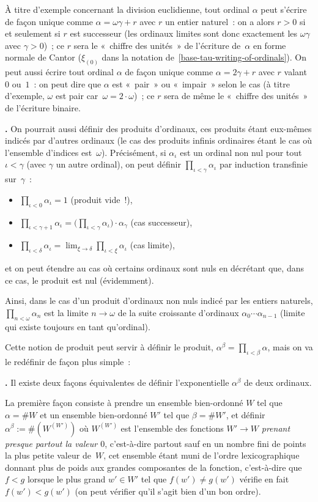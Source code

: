 \documentclass[12pt,a4paper]{article}
\theoremstyle{definition}
\newcommand\thingy{%
\refstepcounter{comcnt}\smallskip\noindent\textbf{\thecomcnt.} }
\begin{document}
À titre d'exemple concernant la division euclidienne, tout ordinal
$\alpha$ peut s'écrire de façon unique comme $\alpha = \omega\gamma +
r$ avec $r$ un entier naturel : on a alors $r>0$ si et seulement si
$r$ est successeur (les ordinaux limites sont donc exactement les
$\omega\gamma$ avec $\gamma>0$) ; ce $r$ sera le « chiffre des
unités » de l'écriture de $\alpha$ en forme normale de Cantor
($\xi_{(0)}$ dans la notation de \ref{base-tau-writing-of-ordinals}).
On peut aussi écrire tout ordinal $\alpha$ de façon unique comme
$\alpha = 2\gamma + r$ avec $r$ valant $0$ ou $1$ : on peut dire que
$\alpha$ est « pair » ou « impair » selon le cas (à titre d'exemple,
$\omega$ est pair car $\omega = 2\cdot\omega$) ; ce $r$ sera de même
le « chiffre des unités » de l'écriture binaire.

\thingy On pourrait aussi définir des produits d'ordinaux, ces
produits étant eux-mêmes indicés par d'autres ordinaux (le cas des
produits infinis ordinaires étant le cas où l'ensemble d'indices
est $\omega$).  Précisément, si $\alpha_\iota$ est un ordinal non nul
pour tout $\iota < \gamma$ (avec $\gamma$ un autre ordinal), on peut
définir $\prod_{\iota<\gamma} \alpha_\iota$ par induction transfinie
sur $\gamma$ :
\begin{itemize}
\item $\prod_{\iota<0} \alpha_\iota = 1$ (produit vide !),
\item $\prod_{\iota<\gamma+1} \alpha_\iota = \big(\prod_{\iota<\gamma}
  \alpha_\iota\big) \cdot \alpha_\gamma$ (cas successeur),
\item $\prod_{\iota<\delta} \alpha_\iota = \lim_{\xi\to\delta}
  \prod_{\iota<\xi} \alpha_\iota$ (cas limite),
\end{itemize}
et on peut étendre au cas où certains ordinaux sont nuls en décrétant
que, dans ce cas, le produit est nul (évidemment).

Ainsi, dans le cas d'un produit d'ordinaux non nuls indicé par les
entiers naturels, $\prod_{n<\omega} \alpha_n$ est la limite
$n\to\omega$ de la suite croissante d'ordinaux $\alpha_0 \cdots
\alpha_{n-1}$ (limite qui existe toujours en tant qu'ordinal).

Cette notion de produit peut servir à définir le produit,
$\alpha^\beta = \prod_{\iota<\beta} \alpha$, mais on va le redéfinir
de façon plus simple :

\thingy Il existe deux façons équivalentes de définir l'exponentielle
$\alpha^\beta$ de deux ordinaux.

La première façon consiste à prendre un ensemble bien-ordonné $W$ tel
que $\alpha = \#W$ et un ensemble bien-ordonné $W'$ tel que $\beta =
\#W'$, et définir $\alpha ^ \beta := \#(W^{(W')})$ où $W^{(W')}$ est
l'ensemble des fonctions $W' \to W$ \emph{prenant presque partout la
  valeur $0$}, c'est-à-dire partout sauf en un nombre fini de points
la plus petite valeur de $W$, cet ensemble étant muni de l'ordre
lexicographique donnant plus de poids aux grandes composantes de la
fonction, c'est-à-dire que $f < g$ lorsque le plus grand $w' \in W'$
tel que $f(w') \neq g(w')$ vérifie en fait $f(w') < g(w')$ (on peut
vérifier qu'il s'agit bien d'un bon ordre).
\end{document}
